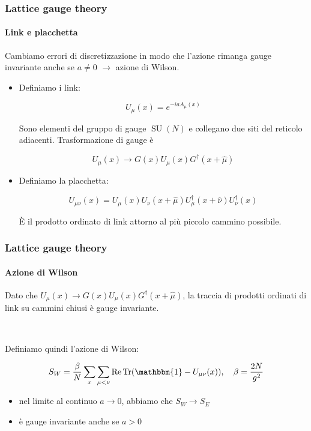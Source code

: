 \documentclass{beamer}
\newcommand{\SU}{\operatorname{SU}}
\newcommand{\id}{\mathbbm{1}}
\begin{document}
\begin{frame}
	\frametitle{Lattice gauge theory}
	\framesubtitle{Link e placchetta}

	Cambiamo errori di discretizzazione in modo che l'azione rimanga gauge invariante anche se $a \ne 0$
	$\longrightarrow$ \alert{azione di Wilson}.

	\begin{itemize}
		\item Definiamo i \alert{link}:
		
		\begin{equation*}
			U_\mu(x) = e^{-iaA_\mu(x)}
		\end{equation*}
		
		Sono elementi del gruppo di gauge $\SU(N)$ e collegano due siti del reticolo adiacenti. Trasformazione di gauge è

		\begin{equation*}
			U_\mu(x) \rightarrow G(x) U_\mu(x) G^\dagger(x + \hat{\mu})
		\end{equation*}
		
		\item Definiamo la \alert{placchetta}: 
		
		\begin{equation*}
			U_{\mu\nu}(x) = U_\mu(x) U_\nu(x + \hat{\mu}) U_\mu^\dagger(x + \hat{\nu}) U_\nu^\dagger(x)
		\end{equation*}
		
		È il prodotto ordinato di link attorno al più piccolo cammino possibile. 
	\end{itemize}

\end{frame}

\begin{frame}
	\frametitle{Lattice gauge theory}
	\framesubtitle{Azione di Wilson}
	
	Dato che $U_\mu(x) \rightarrow G(x) U_\mu(x) G^\dagger(x + \hat{\mu})$, la traccia di prodotti ordinati di link
	su cammini chiusi è \alert{gauge invariante}.

	\

	Definiamo quindi l'\alert{azione di Wilson}:

	\begin{equation*}
		S_W = \frac{\beta}{N} \sum_x \sum_{\mu<\nu} \Re \Tr(\id - U_{\mu\nu}(x)) \qc \beta = \frac{2N}{g^2}
	\end{equation*}

	\begin{itemize}
		\item nel limite al continuo $a \rightarrow 0$, abbiamo che $S_W \rightarrow S_E$
		\item è \alert{gauge invariante} anche se $a > 0$
	\end{itemize}
\end{frame}
\end{document}
